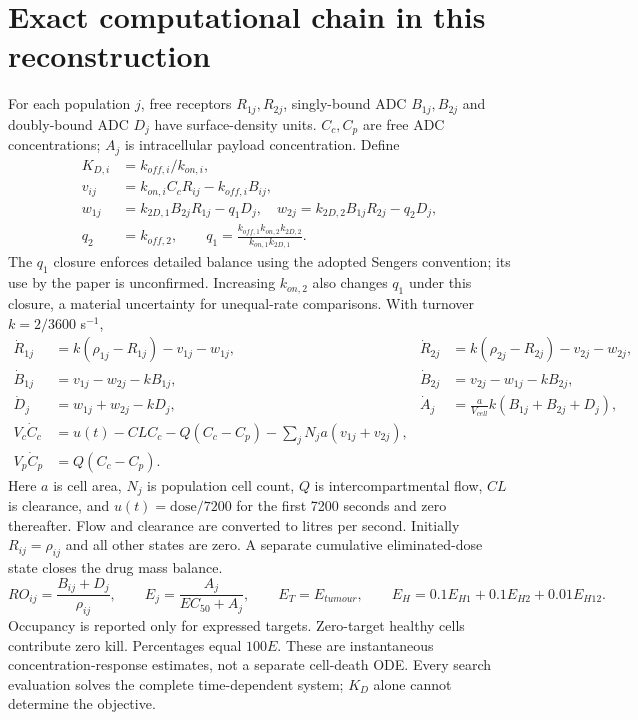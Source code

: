 \documentclass[10pt,a4paper]{article}
\begin{document}
\section*{Exact computational chain in this reconstruction}
For each population $j$, free receptors $R_{1j},R_{2j}$, singly-bound ADC $B_{1j},B_{2j}$ and doubly-bound ADC $D_j$ have surface-density units. $C_c,C_p$ are free ADC concentrations; $A_j$ is intracellular payload concentration. Define
\begin{align*}
K_{D,i}&=k_{off,i}/k_{on,i},\\
v_{ij}&=k_{on,i} C_cR_{ij}-k_{off,i}B_{ij},\\
w_{1j}&=k_{2D,1}B_{2j}R_{1j}-q_1D_j,\quad
w_{2j}=k_{2D,2}B_{1j}R_{2j}-q_2D_j,\\
q_2&=k_{off,2},\qquad q_1=\frac{k_{off,1}k_{on,2}k_{2D,2}}{k_{on,1}k_{2D,1}}.
\end{align*}
The $q_1$ closure enforces detailed balance using the adopted Sengers convention; its use by the paper is unconfirmed. Increasing $k_{on,2}$ also changes $q_1$ under this closure, a material uncertainty for unequal-rate comparisons. With turnover $k=2/3600$ s$^{-1}$,
\begin{align*}
\dot R_{1j}&=k(\rho_{1j}-R_{1j})-v_{1j}-w_{1j},&
\dot R_{2j}&=k(\rho_{2j}-R_{2j})-v_{2j}-w_{2j},\\
\dot B_{1j}&=v_{1j}-w_{2j}-kB_{1j},&
\dot B_{2j}&=v_{2j}-w_{1j}-kB_{2j},\\
\dot D_j&=w_{1j}+w_{2j}-kD_j,&
\dot A_j&=\frac{a}{V_{cell}}k(B_{1j}+B_{2j}+D_j),\\
V_c\dot C_c&=u(t)-CL C_c-Q(C_c-C_p)-\sum_jN_ja(v_{1j}+v_{2j}),\\
V_p\dot C_p&=Q(C_c-C_p).
\end{align*}
Here $a$ is cell area, $N_j$ is population cell count, $Q$ is intercompartmental flow, $CL$ is clearance, and $u(t)=\mathrm{dose}/7200$ for the first 7200 seconds and zero thereafter. Flow and clearance are converted to litres per second. Initially $R_{ij}=\rho_{ij}$ and all other states are zero. A separate cumulative eliminated-dose state closes the drug mass balance.
\[
RO_{ij}=\frac{B_{ij}+D_j}{\rho_{ij}},\qquad
E_j=\frac{A_j}{EC_{50}+A_j},\qquad
E_T=E_{tumour},\qquad E_H=0.1E_{H1}+0.1E_{H2}+0.01E_{H12}.
\]
Occupancy is reported only for expressed targets. Zero-target healthy cells contribute zero kill. Percentages equal $100E$. These are instantaneous concentration-response estimates, not a separate cell-death ODE. Every search evaluation solves the complete time-dependent system; $K_D$ alone cannot determine the objective.
\end{document}
